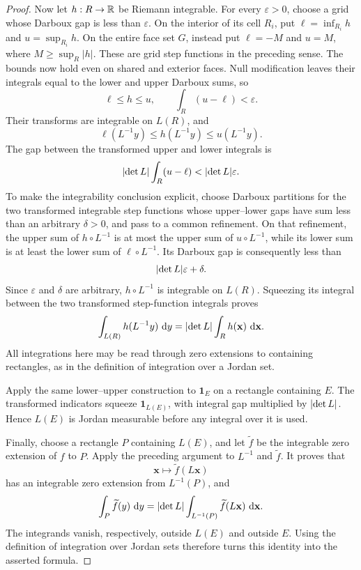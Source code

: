 \begin{proof}
Now let \(h:R\to\mathbb{R}\) be Riemann integrable.  For every \(\varepsilon>0\),
choose a grid whose Darboux gap is less than $\varepsilon$.
On the interior of its cell $R_i$, put
$\ell=\inf_{R_i}h$ and $u=\sup_{R_i}h$.
On the entire face set $G$, instead put $\ell=-M$ and $u=M$, where
$M\geq\sup_R|h|$. These are grid step functions in the preceding sense.
The bounds now hold even on shared and exterior faces. Null modification
leaves their integrals equal to the lower and upper Darboux sums, so
\[
\ell\leq h\leq u,
\qquad
\int_R(u-\ell)<\varepsilon.
\]
Their transforms are integrable on \(L(R)\), and
\[
\ell(L^{-1}y)\leq h(L^{-1}y)\leq u(L^{-1}y).
\]
The gap between the transformed upper and lower integrals is
\[
\lvert \det L\rvert\int_R(u-\ell)
<
\lvert \det L\rvert\varepsilon.
\]
To make the integrability conclusion explicit, choose Darboux partitions for
the two transformed integrable step functions whose upper--lower gaps have
sum less than an arbitrary \(\delta>0\), and pass to a common refinement.
On that refinement, the upper sum of \(h\circ L^{-1}\) is at most the upper
sum of \(u\circ L^{-1}\), while its lower sum is at least the lower sum of
\(\ell\circ L^{-1}\).  Its Darboux gap is consequently less than
\[
\lvert \det L\rvert\varepsilon+\delta.
\]
Since \(\varepsilon\) and \(\delta\) are arbitrary,
\(h\circ L^{-1}\) is integrable on \(L(R)\).  Squeezing its integral between
the two transformed step-function integrals proves
\[
\int_{L(R)}h(L^{-1}y)\,\mathop{}\!\mathrm{d} y
=
\lvert \det L\rvert\int_Rh(\mathbf{x})\,\mathop{}\!\mathrm{d}\mathbf{x}.
\]
All integrations here may be read through zero extensions to containing
rectangles, as in the definition of integration over a Jordan set.

Apply the same lower--upper construction to \(\mathbf1_E\) on a rectangle
containing \(E\).  The transformed indicators squeeze
\(\mathbf1_{L(E)}\), with integral gap multiplied by \(\lvert \det L\rvert\).
Hence \(L(E)\) is Jordan measurable before any integral over it is used.

Finally, choose a rectangle \(P\) containing \(L(E)\), and let
\(\widetilde f\) be the integrable zero extension of \(f\) to \(P\).
Apply the preceding argument to \(L^{-1}\) and \(\widetilde f\).  It proves
that
\[
\mathbf{x}\longmapsto\widetilde f(L\mathbf{x})
\]
has an integrable zero extension from \(L^{-1}(P)\), and
\[
\int_P\widetilde f(y)\,\mathop{}\!\mathrm{d} y
=
\lvert \det L\rvert\int_{L^{-1}(P)}\widetilde f(L\mathbf{x})\,\mathop{}\!\mathrm{d}\mathbf{x}.
\]
The integrands vanish, respectively, outside \(L(E)\) and outside \(E\).
Using the definition of integration over Jordan sets therefore turns this
identity into the asserted formula.
\end{proof}


